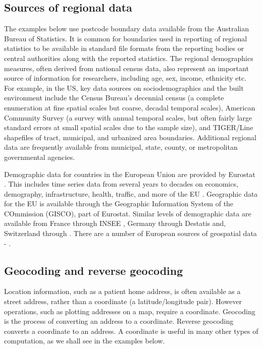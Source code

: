 \documentclass[utf8]{frontiersHLTH}
\begin{document}
\subsection{Sources of regional data}\label{sources-of-regional-data}

The examples below use postcode boundary data available from the
Australian Bureau of Statistics. It is common for boundaries used in
reporting of regional statistics to be available in standard file
formats from the reporting bodies or central authorities along with
the reported statistics. The regional demographics measures, often
derived from national census data, also represent an important source
of information for researchers, including age, sex, income, ethnicity
etc.  For example, in the US, key data sources on sociodemographics
and the built environment include the Census Bureau's decennial census
\cite{us_census_bureau_decennial} (a complete enumeration at fine
spatial scales but coarse, decadal temporal scales), American
Community Survey\cite{us_census_bureau_acs} (a survey
with annual temporal scales, but often fairly large standard errors at
small spatial scales due to the sample size), and TIGER/Line
shapefiles\cite{us_census_tiger_line} of tract,
municipal, and urbanized area boundaries. Additional regional data are
frequently available from municipal, state, county, or metropolitan
governmental agencies.

Demographic data for countries in the European Union are provided by
Eurostat \cite{eurostat}. This includes time series data from several
years to decades on economics, demography, infrastructure, health,
traffic, and more of the EU \cite{Lahti2017}. Geographic data for the
EU is available through the Geographic Information System of the
COmmission (GISCO), part of Eurostat. Similar levels of demographic
data are available from France through INSEE \cite{insee}, Germany
through Destatis \cite{destatis} and, Switzerland through
\cite{swiss-bfs}. There are a number of European sources of geospatial
data - \cite{diva-gis,germany-gis,swiss-3d}.

\subsection{Geocoding and reverse
geocoding}\label{geocoding-and-reverse-geocoding}

Location information, such as a patient home address, is often available
as a street address, rather than a coordinate (a latitude/longitude
pair). However operations, such as plotting addresses on a map, require
a coordinate. Geocoding is the process of converting an address to a
coordinate. Reverse geocoding converts a coordinate to an address. A
coordinate is useful in many other types of computation, as we shall see
in the examples below.
\end{document}
